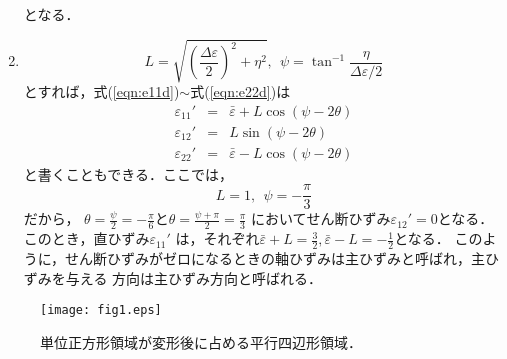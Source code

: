 \documentclass[10pt,a4j]{jarticle}
\begin{document}
\begin{enumerate}
\[	\]
	となる．
\item
	\begin{equation}
		L=\sqrt{\left(\frac{\Delta \varepsilon}{2}\right)^2 + \eta ^2 }, 
		\ \ 
		\psi=\tan^{-1}\frac{\eta}{\Delta \varepsilon/2}
	\end{equation}
	とすれば，式(\ref{eqn:e11d})$\sim$式(\ref{eqn:e22d})は
	\begin{eqnarray}
		\varepsilon_{11}' &=& 
			\bar \varepsilon + 
			L \cos \left( \psi-2\theta  \right)	
			\label{eqn:e11d2}
			\\
		\varepsilon_{12}' &=& 
			L \sin \left( \psi-2\theta  \right)	
			\label{eqn:e12d2}
			\\
		\varepsilon_{22}' &=& 
			\bar \varepsilon - 
			L \cos \left( \psi-2\theta  \right)	
			\label{eqn:e22d2}
	\end{eqnarray}
	と書くこともできる．ここでは，
	\[
		L=1, \ \ \psi =-\frac{\pi}{3}
	\]
	だから，
	$\theta=\frac{\psi}{2}=-\frac{\pi}{6}$と$\theta=\frac{\psi+\pi}{2}=\frac{\pi}{3}$
	においてせん断ひずみ$\varepsilon_{12}'=0$となる．このとき，直ひずみ$\varepsilon_{11}'$
	は，それぞれ$\bar \varepsilon+L=\frac{3}{2}, \bar \varepsilon -L=-\frac{1}{2}$となる．
	このように，せん断ひずみがゼロになるときの軸ひずみは主ひずみと呼ばれ，主ひずみを与える
	方向は主ひずみ方向と呼ばれる．
\end{enumerate}
\begin{figure}[h]
	\begin{center}
	\texttt{[image: fig1.eps]} 
	\end{center}
	\vspace{-5mm}
	\caption{単位正方形領域が変形後に占める平行四辺形領域．} 
	\label{fig:fig1}
\end{figure}
\end{document}
